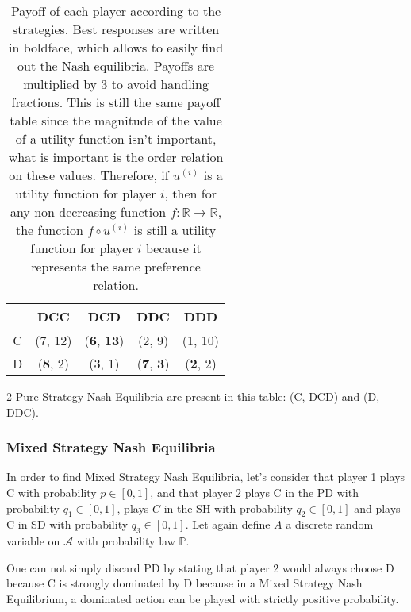\documentclass{article}
\newcommand{\R}{\mathbb R}
\begin{document}
\begin{table}[!h]
\centering
\begin{tabular}{c||c|c|c|c}
& DCC & DCD & DDC & DDD \\ \hline \hline
C & (7, 12) & (\textbf {6}, \textbf {13}) & (2, 9) & (1, 10) \\ \hline
D & (\textbf {8}, 2) & (3, 1) & (\textbf {7}, \textbf {3}) & (\textbf{2}, 2)
\end{tabular}
\caption{Payoff of each player according to the strategies. Best responses are written in boldface, which allows
to easily find out the Nash equilibria. Payoffs are multiplied by 3 to avoid handling fractions. This is still
the same payoff table since the magnitude of the value of a utility function isn't important, what is important
is the order relation on these values. Therefore, if $u^{(i)}$ is a utility function for player $i$, then
for any non decreasing function $f : \R \to \R$, the function $f \circ u^{(i)}$ is still a utility function
for player $i$ because it represents the same preference relation.\label{tab:expected payoff Bayes}}
\end{table}

2 Pure Strategy Nash Equilibria are present in this table: (C, DCD) and (D, DDC).

\subsubsection{Mixed Strategy Nash Equilibria}
In order to find Mixed Strategy Nash Equilibria, let's consider that player 1 plays C with probability $p \in [0, 1]$,
and that player 2 plays C in the PD with probability $q_1 \in [0, 1]$, plays $C$ in the SH with probability
$q_2 \in [0, 1]$ and plays C in SD with probability $q_3 \in [0, 1]$. Let again define $A$ a discrete random variable
on $\mathcal A$ with probability law $\mathbb P$.

One can not simply discard PD by stating that player 2 would always choose D because C is strongly dominated by D
because in a Mixed Strategy Nash Equilibrium, a dominated action can be played with strictly positive probability.
\end{document}
